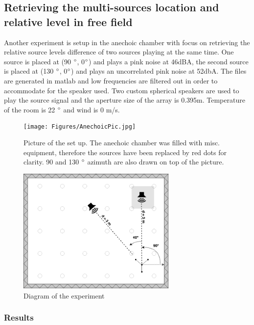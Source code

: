 \newpage
\subsection{Retrieving the multi-sources location and relative level in free field}

Another experiment is setup in the anechoic chamber with focus on retrieving the relative source levels difference of two sources playing at the same time. One source is placed at (90 $\degree$, 0$\degree$) and plays a pink noise at 46dBA, the second source is placed at (130 $\degree$, 0$\degree$) and plays an uncorrelated pink noise at 52dbA. The files are generated in matlab and low frequencies are filtered out in order to accommodate for the speaker used. Two custom spherical speakers are used to play the source signal and the aperture size of the array is 0.395m. Temperature of the room is 22 $\degree$ and wind is 0 m/s.

\begin{figure}[H]
    \centering
    \texttt{[image: Figures/AnechoicPic.jpg]}
    \caption{Picture of the set up. The anechoic chamber was filled with misc. equipment, therefore the sources have been replaced by red dots for clarity. 90 and 130 $\degree$ azimuth are also drawn on top of the picture.}
    \label{fig:Anechoicpic1}
\end{figure}

\begin{figure}[H]
    \centering
    \includegraphics[width=0.7\textwidth]{Figures/Anechoicexp3.png}
    \caption{Diagram of the experiment}
    \label{fig:Anechoicexp3}
\end{figure}

\subsubsection{Results}

